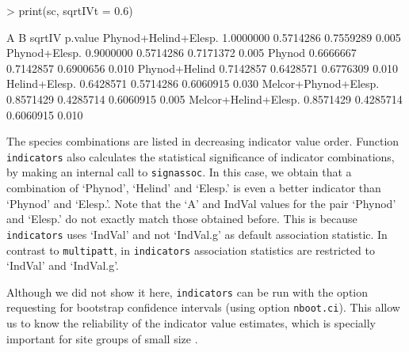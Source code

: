 \documentclass[11pt,a4paper]{article}
\begin{document}
\begin{Schunk}
\begin{Sinput}
> print(sc, sqrtIVt = 0.6)
\end{Sinput}
\begin{Soutput}
                             A         B    sqrtIV p.value
Phynod+Helind+Elesp. 1.0000000 0.5714286 0.7559289   0.005
Phynod+Elesp.        0.9000000 0.5714286 0.7171372   0.005
Phynod               0.6666667 0.7142857 0.6900656   0.010
Phynod+Helind        0.7142857 0.6428571 0.6776309   0.010
Helind+Elesp.        0.6428571 0.5714286 0.6060915   0.030
Melcor+Phynod+Elesp. 0.8571429 0.4285714 0.6060915   0.005
Melcor+Helind+Elesp. 0.8571429 0.4285714 0.6060915   0.010
\end{Soutput}
\end{Schunk}
The species combinations are listed in decreasing indicator value order. Function \texttt{indicators} also calculates the statistical significance of indicator combinations, by making an internal call to \texttt{signassoc}. In this case, we obtain that a combination of `Phynod', `Helind' and `Elesp.' is even a better indicator than `Phynod' and `Elesp.'. Note that the `A' and IndVal values for the pair `Phynod' and `Elesp.' do not exactly match those obtained before. This is because \texttt{indicators} uses `IndVal' and not `IndVal.g' as default association statistic. In contrast to \texttt{multipatt}, in \texttt{indicators} association statistics are restricted to `IndVal' and `IndVal.g'.

Although we did not show it here, \texttt{indicators} can be run with the option requesting for bootstrap confidence intervals (using option \texttt{nboot.ci}). This allow us to know the reliability of the indicator value estimates, which is specially important for site groups of small size \citep{DeCaceres2012}.
\end{document}
